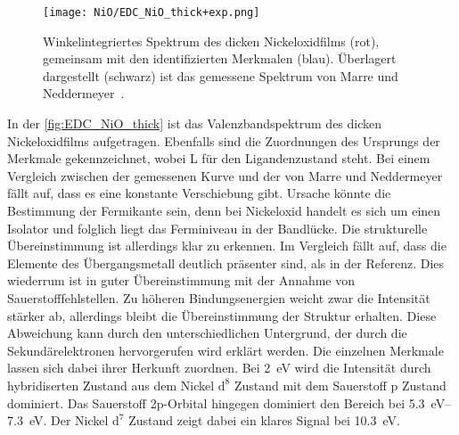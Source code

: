         \begin{figure}
            \centering
            \texttt{[image: NiO/EDC\_NiO\_thick+exp.png]}
            \caption{Winkelintegriertes Spektrum des dicken Nickeloxidfilms (rot), gemeinsam mit den identifizierten Merkmalen (blau).
            Überlagert dargestellt (schwarz) ist das gemessene Spektrum von Marre und Neddermeyer~\cite{NiO_7}.} 
            \label{fig:EDC_NiO_thick}
        \end{figure}
        In der \autoref{fig:EDC_NiO_thick} ist das Valenzbandspektrum des dicken Nickeloxidfilms aufgetragen.
        Ebenfalls sind die Zuordnungen des Ursprungs der Merkmale gekennzeichnet, wobei L für den Ligandenzustand steht.
        Bei einem Vergleich zwischen der gemessenen Kurve und der von Marre und Neddermeyer~\cite{NiO_7} fällt auf, dass es eine konstante Verschiebung gibt.
        Ursache könnte die Bestimmung der Fermikante sein, denn bei Nickeloxid handelt es sich um einen Isolator und folglich liegt das Ferminiveau in der Bandlücke.
        Die strukturelle Übereinstimmung ist allerdings klar zu erkennen. 
        Im Vergleich fällt auf, dass die Elemente des Übergangsmetall deutlich präsenter sind, als in der Referenz.
        Dies wiederrum ist in guter Übereinstimmung mit der Annahme von Sauerstofffehlstellen.
        Zu höheren Bindungsenergien weicht zwar die Intensität stärker ab, allerdings bleibt die Übereinstimmung der Struktur erhalten.
        Diese Abweichung kann durch den unterschiedlichen Untergrund, der durch die Sekundärelektronen hervorgerufen wird erklärt werden.
        Die einzelnen Merkmale lassen sich dabei ihrer Herkunft zuordnen. 
        Bei \SI{2}{\electronvolt} wird die Intensität durch hybridiserten Zustand aus dem Nickel $\text{d}^8$ Zustand mit dem Sauerstoff p Zustand dominiert.
        Das Sauerstoff 2p-Orbital hingegen dominiert den Bereich bei \SIrange[range-phrase=\:und\:]{5.3}{7.3}{\electronvolt}.
        Der Nickel $\text{d}^7$ Zustand zeigt dabei ein klares Signal bei \SI{10.3}{\electronvolt}.


